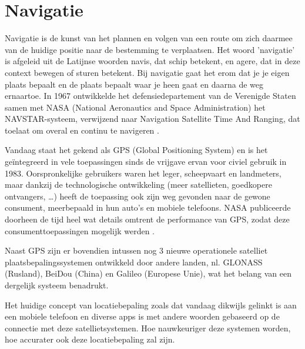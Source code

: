 

\section{Navigatie}
\label{sec:navigatie}

Navigatie is de kunst van het plannen en volgen van een route om zich daarmee van de huidige positie naar de bestemming te verplaatsen. Het woord ’navigatie’ is afgeleid uit de Latijnse woorden navis, dat schip betekent, en agere, dat in deze context bewegen of sturen betekent. Bij navigatie gaat het erom dat je je eigen plaats bepaalt en de plaats bepaalt waar je heen gaat en daarna de weg ernaartoe. 
In 1967 ontwikkelde het defensiedepartement van de Verenigde Staten samen met NASA (National Aeronautics and Space Administration) het NAVSTAR-systeem, verwijzend naar Navigation Satellite Time And Ranging, dat toelaat om overal en continu te navigeren \autocite{Bowditch2002}. 


Vandaag staat het gekend als GPS (Global Positioning System) en is het geïntegreerd in vele toepassingen sinds de vrijgave ervan voor civiel gebruik in 1983. Oorspronkelijke gebruikers waren het leger, scheepvaart en landmeters, maar dankzij de technologische ontwikkeling (meer satellieten, goedkopere ontvangers, …) heeft de toepassing ook zijn weg gevonden naar de gewone consument, meerbepaald in hun auto’s en mobiele telefoons. NASA publiceerde doorheen de tijd heel wat details omtrent de performance van GPS, zodat deze consumenttoepassingen mogelijk werden \autocite{Zaidman2008}.

Naast GPS zijn er bovendien intussen nog 3 nieuwe operationele satelliet plaatsbepalingssystemen ontwikkeld door andere landen, nl. GLONASS (Rusland), BeiDou (China) en Galileo (Europese Unie), wat het belang van een dergelijk systeem benadrukt.

Het huidige concept van locatiebepaling zoals dat vandaag dikwijls gelinkt is aan een mobiele telefoon en diverse apps is met andere woorden gebaseerd op de connectie met deze satellietsystemen. Hoe nauwkeuriger deze systemen worden, hoe accurater ook deze locatiebepaling zal zijn.

